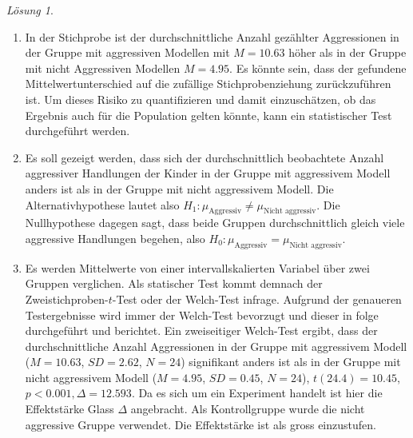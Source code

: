 \documentclass[
]{book}
\providecommand{\tightlist}{%
  \setlength{\itemsep}{0pt}\setlength{\parskip}{0pt}}
\theoremstyle{definition}
\theoremstyle{definition}
\theoremstyle{definition}
\theoremstyle{definition}
\theoremstyle{remark}
\newtheorem*{solution}{Lösung}
\begin{document}
\begin{solution}
\begin{enumerate}
\def\labelenumi{\alph{enumi})}
\tightlist
\item
  In der Stichprobe ist der durchschnittliche Anzahl gezählter Aggressionen in der Gruppe mit aggressiven Modellen mit \(M = 10.63\) höher als in der Gruppe mit nicht Aggressiven Modellen \(M = 4.95\). Es könnte sein, dass der gefundene Mittelwertunterschied auf die zufällige Stichprobenziehung zurückzuführen ist. Um dieses Risiko zu quantifizieren und damit einzuschätzen, ob das Ergebnis auch für die Population gelten könnte, kann ein statistischer Test durchgeführt werden.
\item
  Es soll gezeigt werden, dass sich der durchschnittlich beobachtete Anzahl aggressiver Handlungen der Kinder in der Gruppe mit aggressivem Modell anders ist als in der Gruppe mit nicht aggressivem Modell. Die Alternativhypothese lautet also \(H_1: \mu_\text{Aggressiv} \neq \mu_\text{Nicht aggressiv}\). Die Nullhypothese dagegen sagt, dass beide Gruppen durchschnittlich gleich viele aggressive Handlungen begehen, also \(H_0: \mu_\text{Aggressiv} = \mu_\text{Nicht aggressiv}\).
\item
  Es werden Mittelwerte von einer intervallskalierten Variabel über zwei Gruppen verglichen. Als statischer Test kommt demnach der Zweistichproben-\(t\)-Test oder der Welch-Test infrage. Aufgrund der genaueren Testergebnisse wird immer der Welch-Test bevorzugt und dieser in folge durchgeführt und berichtet. Ein zweiseitiger Welch-Test ergibt, dass der durchschnittliche Anzahl Aggressionen in der Gruppe mit aggressivem Modell (\(M = 10.63\), \(SD = 2.62\), \(N = 24\)) signifikant anders ist als in der Gruppe mit nicht aggressivem Modell (\(M = 4.95\), \(SD = 0.45\), \(N = 24\)), \(t(24.4) = 10.45\), \(p < 0.001, \Delta = 12.593\). Da es sich um ein Experiment handelt ist hier die Effektstärke Glass \(\Delta\) angebracht. Als Kontrollgruppe wurde die nicht aggressive Gruppe verwendet. Die Effektstärke ist als gross einzustufen.
\end{enumerate}

\end{solution}
\end{document}

